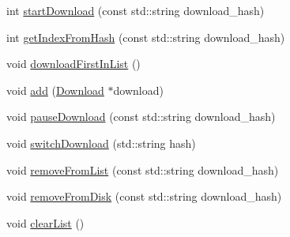 \begin{DoxyCompactItemize}
\item 
int \hyperlink{namespaceDownloadManager_a33375c692dd22e3cdbbff96f9c8e98b8}{startDownload} (const std::string download\_\-hash)
\item 
int \hyperlink{namespaceDownloadManager_a21e3a4194019aa1291f1db5d7285dc70}{getIndexFromHash} (const std::string download\_\-hash)
\item 
void \hyperlink{namespaceDownloadManager_a218fc871763dadae05a499d720d52bc8}{downloadFirstInList} ()
\item 
void \hyperlink{namespaceDownloadManager_ad9d0c1165fa6f5e1ef9d235b8e0be6ac}{add} (\hyperlink{classDownload}{Download} $\ast$download)
\item 
void \hyperlink{namespaceDownloadManager_aa14d82506c4d6bfa4a3c5c0aa8bb1501}{pauseDownload} (const std::string download\_\-hash)
\item 
void \hyperlink{namespaceDownloadManager_ab550948c2af3875cc3c2577690fa11b7}{switchDownload} (std::string hash)
\item 
void \hyperlink{namespaceDownloadManager_a97ac4c5084453a91ec10737a21272c02}{removeFromList} (const std::string download\_\-hash)
\item 
void \hyperlink{namespaceDownloadManager_afab7784e2d6eb05d8036a1d63a3f71ed}{removeFromDisk} (const std::string download\_\-hash)
\item 
void \hyperlink{namespaceDownloadManager_aadc3aa40bdf4c7236f4220db19b6fbd6}{clearList} ()
\end{DoxyCompactItemize}
